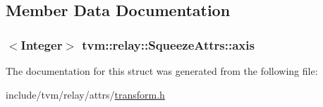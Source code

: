 \subsection{Member Data Documentation}
\subsubsection[{\texorpdfstring{axis}{axis}}]{$<${\bf Integer}$>$ tvm\+::relay\+::\+Squeeze\+Attrs\+::axis}\hypertarget{structtvm_1_1relay_1_1SqueezeAttrs_ac12e95580d7c77a3f7221c528ab3bcb2}{}\label{structtvm_1_1relay_1_1SqueezeAttrs_ac12e95580d7c77a3f7221c528ab3bcb2}


The documentation for this struct was generated from the following file\+:\begin{DoxyCompactItemize}
\item 
include/tvm/relay/attrs/\hyperlink{include_2tvm_2relay_2attrs_2transform_8h}{transform.\+h}\end{DoxyCompactItemize}
